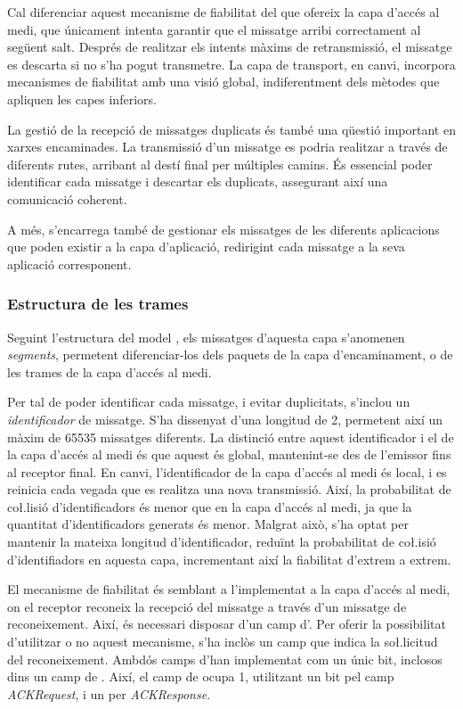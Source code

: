 \documentclass{tfgitic}[2024/07/01]
\begin{document}
{Cal diferenciar aquest mecanisme de fiabilitat del que ofereix la capa d'accés al medi, que únicament intenta garantir que el missatge arribi correctament al següent salt. Després de realitzar els intents màxims de retransmissió, el missatge es descarta si no s'ha pogut transmetre. La capa de transport, en canvi, incorpora mecanismes de fiabilitat amb una visió global, indiferentment dels mètodes que apliquen les capes inferiors.

La gestió de la recepció de missatges duplicats és també una qüestió important en xarxes encaminades. La transmissió d'un missatge es podria realitzar a través de diferents rutes, arribant al destí final per múltiples camins. És essencial poder identificar cada missatge i descartar els duplicats, assegurant així una comunicació coherent. 

A més, s'encarrega també de gestionar els missatges de les diferents aplicacions que poden existir a la capa d'aplicació, redirigint cada missatge a la seva aplicació corresponent.


\subsubsection{Estructura de les trames}
Seguint l'estructura del model , els missatges d'aquesta capa s'anomenen \emph{segments}, permetent diferenciar-los dels paquets de la capa d'encaminament, o de les trames de la capa d'accés al medi. 

Per tal de poder identificar cada missatge, i evitar duplicitats, s'inclou un \emph{identificador} de missatge. S'ha dissenyat d'una longitud de \SI{2}{\byte}, permetent així un màxim de \num{65535} missatges diferents. La distinció entre aquest identificador i el de la capa d'accés al medi és que aquest és global, mantenint-se des de l'emissor fins al receptor final. En canvi, l'identificador de la capa d'accés al medi és local, i es reinicia cada vegada que es realitza una nova transmissió. Així, la probabilitat de co\l.lisió d'identificadors és menor que en la capa d'accés al medi, ja que la quantitat d'identificadors generats és menor. Malgrat això, s'ha optat per mantenir la mateixa longitud d'identificador, reduïnt la probabilitat de co\l.isió d'identifiadors en aquesta capa, incrementant així la fiabilitat d'extrem a extrem. 

El mecanisme de fiabilitat és semblant a l'implementat a la capa d'accés al medi, on el receptor reconeix la recepció del missatge a través d'un missatge de reconeixement. Així, és necessari disposar d'un camp d'. Per oferir la possibilitat d'utilitzar o no aquest mecanisme, s'ha inclòs un camp que indica la so\l.licitud del reconeixement. Ambdós camps d'han implementat com un únic bit, inclosos dins un camp de . Així, el camp de  ocupa \SI{1}{\byte}, utilitzant un bit pel camp \emph{ACKRequest}, i un per \emph{ACKResponse}.

}
\end{document}
